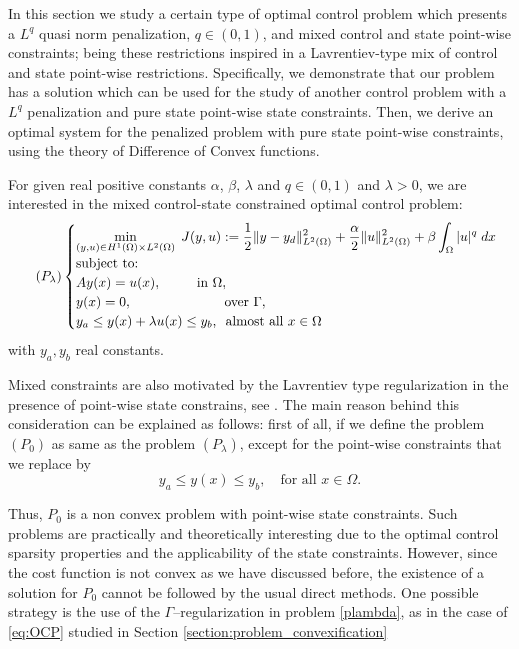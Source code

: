  In this section we study a certain type of optimal control problem which presents a $L^q$ quasi 
 norm penalization, $q\in (0,1)$, and mixed control and state point-wise constraints;
  being these restrictions inspired in a Lavrentiev-type mix of control and state point-wise 
  restrictions. Specifically, we demonstrate that our problem has a solution which can be used 
  for the study of another control problem with a $L^q$ penalization and pure state point-wise 
  state constraints. Then, we derive an optimal system for the penalized problem with pure state 
  point-wise constraints, using the theory of Difference of Convex functions. 

 For given real positive constants  $\alpha$, $\beta$, $\lambda$ and $q\in (0,1)$ and $\lambda>0$, we are interested in the mixed control-state constrained optimal control problem:
\begin{equation}\label{plambda}\tag{$P_{\lambda}$}
    \begin{cases}
    \displaystyle\min_{(y,u)\in H^1(\om)\times L^2(\om)}\; J(y,u) := \frac{1}{2}\norm{y-y_d}^2_{L^2(\om)}+\frac{\alpha}{2}\norm{u}^2_{L^2(\om)}+\beta \int_{\om} |u|^{q}\; dx\\
    \mbox{subject to:}\\
    Ay(x)=u(x), \phantom{aaaaa} \mbox{in } \om,\\
    y(x)=0, \phantom{aaaaaaaaaaaaa} \mbox{over } \Gamma,\\    
    y_a\le y(x)+\lambda u(x)\le y_b,\phantom{a} \mbox{almost all }x\in \Omega
    \end{cases}
\end{equation}
with $y_a, y_b$ real constants. 

\begin{remark}
    Mixed constraints are also motivated by the Lavrentiev type regularization in the 
	presence of point-wise state constrains, see \cite{meyer-2007}. 
    The main reason behind this consideration can be explained as follows: first of all, 
	if we define the problem $(P_0)$ as same as the problem $(P_{\lambda})$, except for 
	the point-wise constraints that we replace by 
	$$y_a\le y(x)\le y_b,\quad \text{for all } x\in \Omega.$$
    
     Thus, $P_{0}$ is a non convex problem with point-wise state constraints. Such problems 
	 are practically and theoretically interesting due to the optimal control sparsity 
	 properties and the applicability of the state constraints. However, since the cost 
	 function is not convex as we have discussed before, the existence of a solution for $P_0$ 
	 cannot be followed by the usual direct methods. One possible strategy is the use of the
	 $\Gamma$--regularization in problem \eqref{plambda}, as in the case of \eqref{eq:OCP} studied in
	 Section \ref{section:problem_convexification}
\end{remark}

